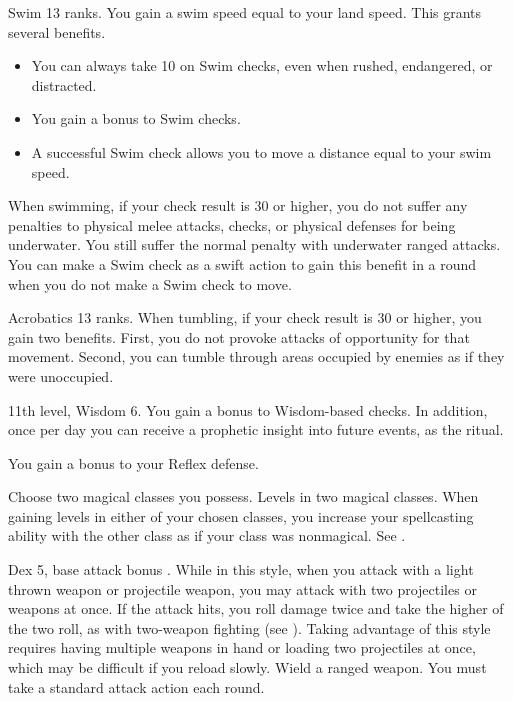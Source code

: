 \featpre Swim 13 ranks.
\featben You gain a swim speed equal to your land speed. This grants several benefits.
\begin{itemize}
    \item You can always take 10 on Swim checks, even when rushed, endangered, or distracted.
    \item You gain a  bonus to Swim checks.
    \item A successful Swim check allows you to move a distance equal to your swim speed.
\end{itemize}

When swimming, if your check result is 30 or higher, you do not suffer any penalties to physical melee attacks, checks, or physical defenses for being underwater. You still suffer the normal penalty with underwater ranged attacks. You can make a Swim check as a swift action to gain this benefit in a round when you do not make a Swim check to move.

\featpre Acrobatics 13 ranks.
\featben When tumbling, if your check result is 30 or higher, you gain two benefits. First, you do not provoke attacks of opportunity for that movement. Second, you can tumble through areas occupied by enemies as if they were unoccupied.

\featpre 11th level, Wisdom 6.
\featben You gain a  bonus to Wisdom-based checks. In addition, once per day you can receive a prophetic insight into future events, as the  ritual.

 You gain a  bonus to your Reflex defense.

Choose two magical classes you possess.
 Levels in two magical classes.
 When gaining levels in either of your chosen classes, you increase your spellcasting ability with the other class as if your class was nonmagical. See .

 Dex 5, base attack bonus .
 While in this style, when you attack with a light thrown weapon or projectile weapon, you may attack with two projectiles or weapons at once. If the attack hits, you roll damage twice and take the higher of the two roll, as with two-weapon fighting (see ). Taking advantage of this style requires having multiple weapons in hand or loading two projectiles at once, which may be difficult if you reload slowly.
\stylereq Wield a ranged weapon. You must take a standard attack action each round.

